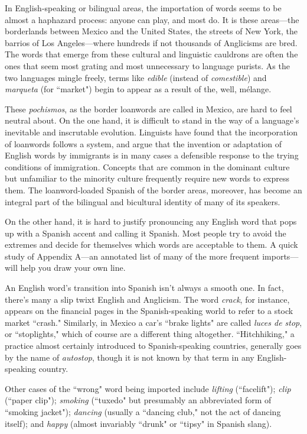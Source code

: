 In English-speaking or bilingual areas, the importation of
words seems to be almost a haphazard process: anyone can play, and
most do. It is these areas---the borderlands between Mexico and the
United States, the streets of New York, the barrios of Los Angeles---where hundreds if not thousands of Anglicisms are bred. The words
that emerge from these cultural and linguistic cauldrons are often the
ones that seem most grating and most unnecessary to language purists.
As the two languages mingle freely, terms like \emph{edible} (instead of \emph{comestible}) and \emph{marqueta} (for ``market") begin to appear as a result of
the, well, mélange.

These \emph{pochismos}, as the border loanwords are called in
Mexico, are hard to feel neutral about. On the one hand, it is difficult to
stand in the way of a language's inevitable and inscrutable evolution.
Linguists have found that the incorporation of loanwords follows a system, and argue that the invention or adaptation of English words by
immigrants is in many cases a defensible response to the trying conditions of immigration. Concepts that are common in the dominant culture but unfamiliar to the minority culture frequently require new
words to express them. The loanword-loaded Spanish of the border
areas, moreover, has become an integral part of the bilingual and bicultural identity of many of its speakers.

On the other hand, it is hard to justify pronouncing any English word that pops up with a Spanish accent and calling it Spanish.
Most people try to avoid the extremes and decide for themselves which
words are acceptable to them. A quick study of Appendix A---an annotated list of many of the more frequent imports---will help you draw
your own line.

An English word's transition into Spanish isn't always a
smooth one. In fact, there's many a slip twixt English and Anglicism.
The word \emph{crack}, for instance, appears on the financial pages in the
Spanish-speaking world to refer to a stock market ``crash." Similarly,
in Mexico a car's ``brake lights" are called \emph{luces de stop}, or ``stoplights," which of course are a different thing altogether. ``Hitchhiking,"
a practice almost certainly introduced to Spanish-speaking countries,
generally goes by the name of \emph{autostop}, though it is not known by that
term in any English-speaking country.

Other cases of the ``wrong" word being imported include \emph{lifting} (``facelift"); \emph{clip} (``paper clip"); \emph{smoking} (``tuxedo" but presumably
an abbreviated form of ``smoking jacket"); \emph{dancing} (usually a ``dancing club," not the act of dancing itself); and \emph{happy} (almost invariably
``drunk" or ``tipsy" in Spanish slang).

